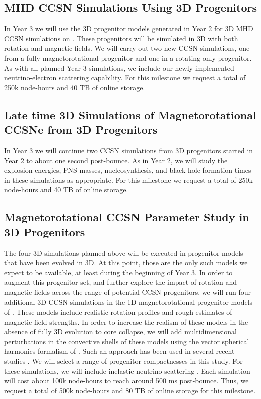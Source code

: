 \documentclass[12pt]{article}
\begin{document}
\subsection{MHD CCSN Simulations Using 3D Progenitors}
\label{sec:Y3mrccsn}

In Year 3 we will use the 3D progenitor models generated in Year 2 for 3D MHD CCSN simulations on \thet.
These progenitors will be simulated in 3D with both rotation and magnetic fields. 
We will carry out two new CCSN simulations, one from a fully magnetorotational progenitor and one in a rotating-only progenitor. 
As with all planned Year 3 simulations, we include our newly-implemented neutrino-electron scattering capability.
For this milestone we request a total of 250k node-hours and 40 TB of online storage.

\subsection{Late time 3D Simulations of Magnetorotational CCSNe from 3D Progenitors}
\label{sec:Y3late}

In Year 3 we will continue two CCSN simulations from 3D progenitors started in Year 2 to about one second post-bounce.
As in Year 2, we will study the explosion energies, PNS masses, nucleosynthesis, and black hole formation times in these simulations as appropriate.
For this milestone we request a total of 250k node-hours and 40 TB of online storage.


\subsection{Magnetorotational CCSN Parameter Study in 3D Progenitors}
\label{sec:Y3aurora}

The four 3D simulations planned above will be executed in progenitor models that have been evolved in 3D. 
At this point, those are the only such models we expect to be available, at least during the beginning of Year 3.
In order to augment this progenitor set, and further explore the impact of rotation and magnetic fields across the range of potential CCSN progenitors, we will run four additional 3D CCSN simulations in the 1D magnetorotational progenitor models of \citep{heger:2005}. 
These models include realistic rotation profiles and rough estimates of magnetic field strengths. 
In order to increase the realism of these models in the absence of fully 3D evolution to core collapse, we will add multidimensional perturbations in the convective shells of these models using the vector spherical harmonics formalism of \citet{chatzopoulos:2014}. 
Such an approach has been used in several recent studies \citep{oconnor:2018b, vartanyan:2019}.
We will select a range of progenitor compactnesses \citep{oconnor:2011, sukhbold:2018} in this study.
For these simulations, we will include inelastic neutrino scattering \citep{oconnor:2015, burrows:2016}.
Each simulation will cost about 100k node-hours to reach around 500 ms post-bounce. 
Thus, we request a total of 500k node-hours and 80 TB of online storage for this milestone.
\end{document}
